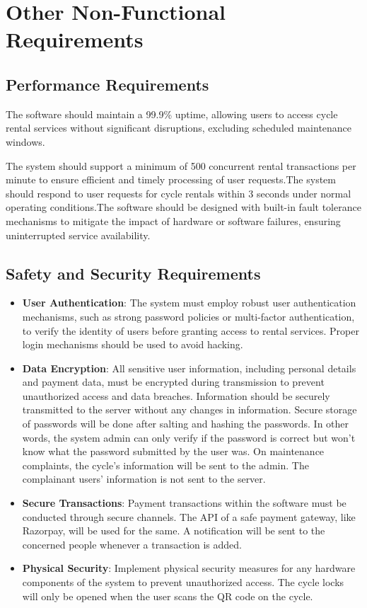 \documentclass[11pt]{article}
\begin{document}
\newpage
\section{Other Non-Functional Requirements}
\subsection{Performance Requirements}
The software should maintain a 99.9\% uptime, allowing users to access cycle rental services without significant disruptions, excluding scheduled maintenance windows.

The system should support a minimum of 500 concurrent rental transactions per minute to ensure efficient and timely processing of user requests.The system should respond to user requests for cycle rentals within 3 seconds under normal operating conditions.The software should be designed with built-in fault tolerance mechanisms to mitigate the impact of hardware or software failures, ensuring uninterrupted service availability.

\subsection{Safety and Security Requirements}
\begin{itemize}
    \item \textbf{User Authentication}: The system must employ robust user authentication mechanisms, such as strong password policies or multi-factor authentication, to verify the identity of users before granting access to rental services. Proper login mechanisms should be used to avoid hacking.
    \item \textbf{Data Encryption}: All sensitive user information, including personal details and payment data, must be encrypted during transmission to prevent unauthorized access and data breaches. Information should be securely transmitted to the server without any changes in information. Secure storage of passwords will be done after salting and hashing the passwords. In other words, the system admin can only verify if the password is correct but won’t know what the password submitted by the user was. On maintenance complaints, the cycle’s information will be sent to the admin. The complainant users’ information is not sent to the server.
    \item \textbf{Secure Transactions}: Payment transactions within the software must be conducted through secure channels. The API of a safe payment gateway, like Razorpay, will be used for the same. A notification will be sent to the concerned people whenever a transaction is added.
    \item \textbf{Physical Security}: Implement physical security measures for any hardware components of the system to prevent unauthorized access. The cycle locks will only be opened when the user scans the QR code on the cycle.
\end{itemize}
\end{document}
